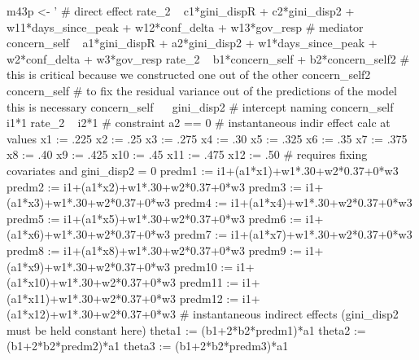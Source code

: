 \documentclass[
]{article}
\newenvironment{Shaded}{\begin{snugshade}}{\end{snugshade}}
\newcommand{\NormalTok}[1]{#1}
\newcommand{\StringTok}[1]{\textcolor[rgb]{0.31,0.60,0.02}{#1}}
\begin{document}
\begin{Shaded}
\begin{Highlighting}[]
\NormalTok{m43p <-}\StringTok{ '   # direct effect}
\StringTok{             rate_2 ~ c1*gini_dispR + c2*gini_disp2 + w11*days_since_peak + w12*conf_delta + w13*gov_resp }
\StringTok{           # mediator}
\StringTok{             concern_self ~ a1*gini_dispR + a2*gini_disp2 + w1*days_since_peak + w2*conf_delta + w3*gov_resp }
\StringTok{             rate_2 ~ b1*concern_self + b2*concern_self2 }
\StringTok{           # this is critical because we constructed one out of the other   }
\StringTok{             concern_self2 ~ concern_self}
\StringTok{           # to fix the residual variance out of the predictions of the model this is necessary}
\StringTok{             concern_self ~~ gini_disp2}
\StringTok{           # intercept naming}
\StringTok{             concern_self ~ i1*1}
\StringTok{             rate_2 ~ i2*1}
\StringTok{           # constraint}
\StringTok{             a2 == 0}
\StringTok{           # instantaneous indir effect calc at values}
\StringTok{             x1 := .225}
\StringTok{             x2 := .25}
\StringTok{             x3 := .275}
\StringTok{             x4 := .30}
\StringTok{             x5 := .325}
\StringTok{             x6 := .35}
\StringTok{             x7 := .375}
\StringTok{             x8 := .40}
\StringTok{             x9 := .425}
\StringTok{             x10 := .45}
\StringTok{             x11 := .475}
\StringTok{             x12 := .50}
\StringTok{           # requires fixing covariates and gini_disp2 = 0 }
\StringTok{             predm1 := i1+(a1*x1)+w1*.30+w2*0.37+0*w3}
\StringTok{             predm2 := i1+(a1*x2)+w1*.30+w2*0.37+0*w3}
\StringTok{             predm3 := i1+(a1*x3)+w1*.30+w2*0.37+0*w3}
\StringTok{             predm4 := i1+(a1*x4)+w1*.30+w2*0.37+0*w3}
\StringTok{             predm5 := i1+(a1*x5)+w1*.30+w2*0.37+0*w3}
\StringTok{             predm6 := i1+(a1*x6)+w1*.30+w2*0.37+0*w3}
\StringTok{             predm7 := i1+(a1*x7)+w1*.30+w2*0.37+0*w3}
\StringTok{             predm8 := i1+(a1*x8)+w1*.30+w2*0.37+0*w3}
\StringTok{             predm9 := i1+(a1*x9)+w1*.30+w2*0.37+0*w3}
\StringTok{             predm10 := i1+(a1*x10)+w1*.30+w2*0.37+0*w3}
\StringTok{             predm11 := i1+(a1*x11)+w1*.30+w2*0.37+0*w3}
\StringTok{             predm12 := i1+(a1*x12)+w1*.30+w2*0.37+0*w3}
\StringTok{           # instantaneous indirect effects (gini_disp2 must be held constant here)}
\StringTok{             theta1 := (b1+2*b2*predm1)*a1}
\StringTok{             theta2 := (b1+2*b2*predm2)*a1}
\StringTok{             theta3 := (b1+2*b2*predm3)*a1}

\end{Highlighting}
\end{Shaded}
\end{document}
